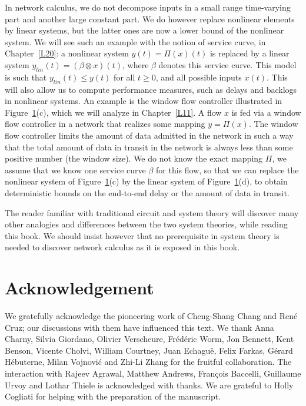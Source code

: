 \begin{figure}[!h]
 
\protect\label{fig:non-linear-system}
\end{figure}

In network calculus, we do not decompose inputs in a small range
time-varying part  and another large constant part. We do however
replace nonlinear elements by linear systems, but the latter ones
are now a lower bound of the nonlinear system. We will see such an
example with the notion of service curve, in Chapter~\ref{L20}: a
nonlinear system $y(t) = \Pi(x)(t) $ is replaced by a linear
system $y_{lin}(t) = (\beta \otimes x)(t)$, where $\beta$ denotes
this service curve. This model is such that $y_{lin}(t) \leq y(t)$
for all $t \geq 0$, and all possible inputs $x(t)$. This will also
allow us to compute performance measures, such as delays and
backlogs in nonlinear systems. An example is the window flow
controller illustrated in Figure~\ref{fig:non-linear-system}(c),
which we will analyze in Chapter~\ref{L11}. A flow $x$ is fed via
a window flow controller in a network that realizes some mapping
$y = \Pi(x)$. The window flow controller limits the amount of data
admitted in the network in such a way that the total amount of
data in transit in the network is always less than some positive
number (the window size). We do not know the exact mapping $\Pi$,
we assume that we know one service curve $\beta$ for this flow, so
that we can replace the nonlinear system of
Figure~\ref{fig:non-linear-system}(c) by the linear system of
Figure~\ref{fig:non-linear-system}(d), to obtain deterministic
bounds on the end-to-end delay or the amount of data in transit.


The reader familiar with traditional circuit and system theory
will discover many other analogies and differences between the two
system theories, while reading this book. We should insist however
that no prerequisite in system theory is needed to discover
network calculus as it is exposed in this book.


\section*{Acknowledgement}
We gratefully acknowledge the pioneering work of Cheng-Shang Chang
and Ren\'{e} Cruz; our discussions with them have influenced this
text. We thank Anna Charny, Silvia Giordano, Olivier Verscheure,
Fr\'{e}d\'{e}ric Worm, Jon Bennett, Kent Benson, Vicente Cholvi,
William Courtney, Juan Echagu\"{e}, Felix Farkas, G\'{e}rard
H\'{e}buterne, Milan Vojnovi\'{c} and Zhi-Li Zhang for the
fruitful collaboration. The interaction with Rajeev Agrawal,
Matthew Andrews, Fran\c{c}ois Baccelli, Guillaume Urvoy and Lothar
Thiele is acknowledged with thanks. We are grateful to Holly
Cogliati for helping with the preparation of the manuscript.
